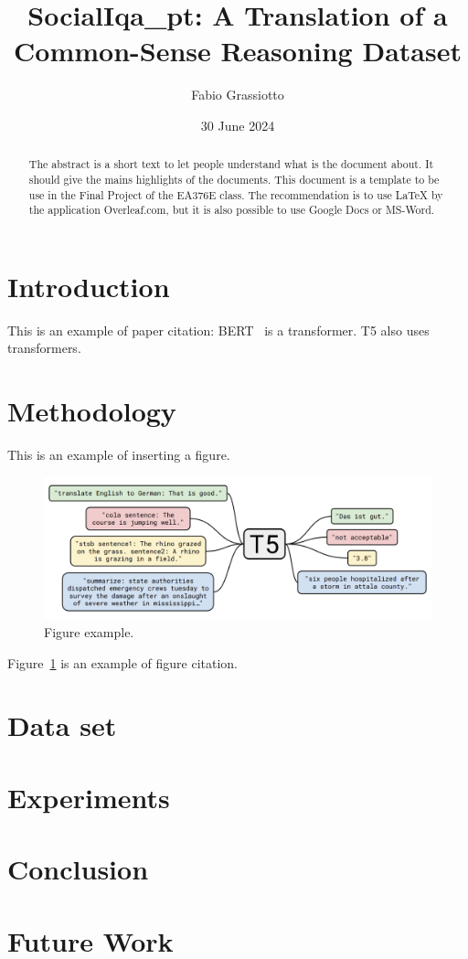 \documentclass{article}
\title{SocialIqa_pt: A Translation of a Common-Sense Reasoning Dataset}
\author{Fabio Grassiotto}
\date{30 June 2024}
\begin{document}
\maketitle

\begin{abstract}
    The abstract is a short text to let people understand what is the document about.
    It should give the mains highlights of the documents.
    This document is a template to be use in the Final Project of the EA376E class.
    The recommendation is to use LaTeX by the application Overleaf.com, but it is also
    possible to use Google Docs or MS-Word.
\end{abstract}

\section{Introduction}

This is an example of paper citation: BERT~ is a transformer. T5 also uses transformers.

\cite{lee2023survey}
\cite{kocmi2023large}
\cite{choi2022curious}
\cite{krause2023commonsense}
\cite{sap2019socialiqa}
\cite{zellers2019recognition}

\section{Methodology} 

This is an example of inserting a figure. 

\begin{figure}[ht]
\centering
\includegraphics[width=.77\textwidth]{figures/t5.png}
\caption{\label{fig:t5}Figure example.}
\end{figure}

Figure~\ref{fig:t5} is an example of figure citation.

\section{Data set}

\section{Experiments}

\section{Conclusion}

\section{Future Work}



\end{document}
